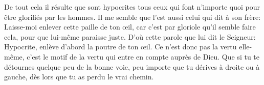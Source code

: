 De tout cela il résulte que sont hypocrites
	tous ceux qui font n’importe quoi pour être glorifiés par les hommes.
Il me semble que l’est aussi celui qui dit à son frère:
	Laisse-moi enlever cette paille de ton œil,
	car c’est par gloriole qu’il semble faire cela,
	pour que lui-même paraisse juste.
D’où cette parole que lui dit le Seigneur:
	Hypocrite, enlève d’abord la poutre de ton œil.
Ce n’est donc pas la vertu elle-même,
	c’est le motif de la vertu qui entre en compte auprès de Dieu.
Que si tu te détournes quelque peu de la bonne voie,
	peu importe que tu dérives à droite ou à gauche,
	dès lors que tu as perdu le vrai chemin.
